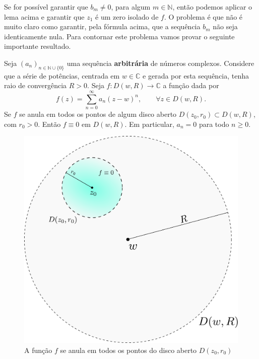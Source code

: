 Se for possível garantir que $b_m\neq 0$, para algum $m\in\mathbb{N}$,
então podemos aplicar o lema acima e garantir que $z_1$ é um 
zero isolado de $f$. O problema é que não é muito claro como 
garantir, pela fórmula acima, 
que a sequência $b_m$ não seja identicamente nula. 
Para contornar este problema vamos provar o seguinte importante resultado.

\begin{lema}\label{lema2-centro-serie-zero-isolado}
Seja $(a_n)_{n\in\mathbb{N}\cup\{0\}}$ uma sequência \textbf{arbitrária} 
de números complexos. Considere que a série de potências, 
centrada em $w\in\mathbb{C}$ e gerada por esta sequência, 
tenha raio de convergência $R>0$. 
Seja $f:D(w,R)\to\mathbb{C}$ a função dada por
\[
f(z) = \sum_{n=0}^{\infty}a_n(z-w)^n, \qquad \forall z\in D(w,R).
\]
Se $f$ se anula em todos os pontos de algum disco aberto 
$D(z_0,r_0)\subset D(w,R)$, com $r_0>0$.
Então $f\equiv 0$ em $D(w,R)$. Em particular, $a_n=0$ para todo $n\geqslant 0$.
\end{lema}

\begin{figure}[H]
\centering
\includegraphics[width=0.6\linewidth]{Figuras/zeros-isolados2}
\caption{A função $f$ se anula em todos os pontos do disco aberto $D(z_0,r_0)$}
\label{fig:zeros-isolados2}
\end{figure}




